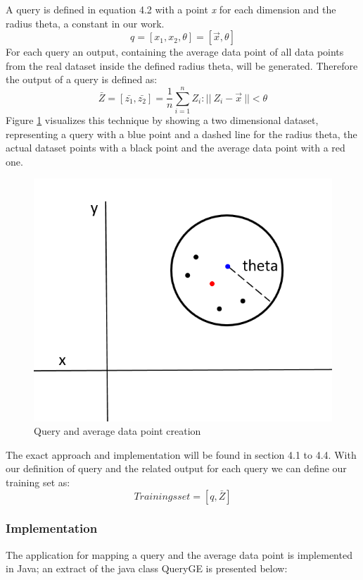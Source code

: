\documentclass{lmproj}
\begin{document}
A query is defined in equation 4.2 with a point \textit{x} for each dimension and the radius theta, a constant in our work.  
\begin{equation}
q=[x_1,x_2,\theta] =[\vec{x},\theta]
\end{equation}
For each query an output, containing the average data point of all data points from the real dataset inside the defined radius theta, will be generated. Therefore the output of a query is defined as:
\begin{equation}
\bar Z = [\bar {z_1}, \bar {z_2}] = \frac{1}{n}{\sum_{i=1}^{n} Z_i}:||\ Z_i - \vec{x}\ ||<\theta
\end{equation}
Figure \ref{fig:Query} visualizes this technique by showing a two dimensional dataset, representing a query with a blue point and a dashed line for the radius theta, the actual dataset points with a black point and the average data point with a red one.
 \begin{figure}[ht]
	\centering
	\includegraphics[width=0.5\linewidth]{Query.PNG}
	\caption[Query]{Query and average data point creation}
	\label{fig:Query}
\end{figure}

The exact approach and implementation will be found in section 4.1 to 4.4. With our definition of query and the related output for each query we can define our training set as:
\begin{equation}
Trainingsset=[q,\bar{Z}]
\end{equation}

\subsubsection{Implementation}

The application for mapping a query and the average data point is implemented in Java; an extract of the java class QueryGE is presented below:


\end{document}
